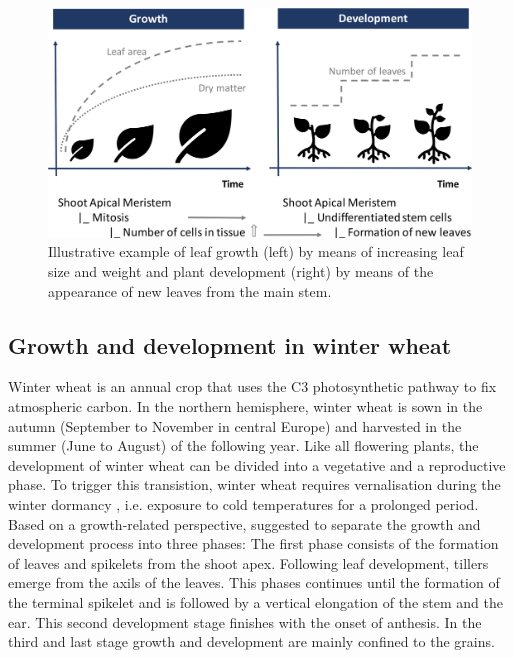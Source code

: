 \begin{figure}[H]
    \centering
    \includegraphics[width=\textwidth]{01-Introduction/img/growth_and_development.pdf}
    \caption{Illustrative example of leaf growth (left) by means of increasing leaf size and weight and plant development (right) by means of the appearance of new leaves from the main stem.}
    \label{fig:growth-development-biology}
\end{figure}

\subsection{Growth and development in winter wheat}

Winter wheat is an annual crop that uses the C3 photosynthetic pathway to fix atmospheric carbon. In the northern hemisphere, winter wheat is sown in the autumn (September to November in central Europe) and harvested in the summer (June to August) of the following year. Like all flowering plants, the development of winter wheat can be divided into a vegetative and a reproductive phase. To trigger this transistion, winter wheat requires vernalisation during the winter dormancy \citep{fedorov_photoperiodism_1976}, i.e. exposure to cold temperatures for a prolonged period.
Based on a growth-related perspective, \cite{kirby_analysis_1988} suggested to separate the growth and development process into three phases: The first phase consists of the formation of leaves and spikelets from the shoot apex. Following leaf development, tillers emerge from the axils of the leaves. This phases continues until the formation of the terminal spikelet and is followed by a vertical elongation of the stem and the ear. This second development stage finishes with the onset of anthesis. In the third and last stage growth and development are mainly confined to the grains.

